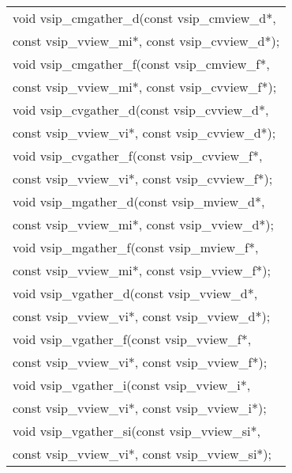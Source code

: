 \\\cvsiplh
\afh
\\\hspace*{.04\textwidth} {
\ttfamily
\begin{tabular}[H]{l}
void vsip\_cmgather\_d(const vsip\_cmview\_d*,\\*\hspace{.7cm}const vsip\_vview\_mi*, const vsip\_cvview\_d*);\\
void vsip\_cmgather\_f(const vsip\_cmview\_f*,\\*\hspace{.7cm}const vsip\_vview\_mi*, const vsip\_cvview\_f*);\\
void vsip\_cvgather\_d(const vsip\_cvview\_d*,\\*\hspace{.7cm}const vsip\_vview\_vi*, const vsip\_cvview\_d*);\\
void vsip\_cvgather\_f(const vsip\_cvview\_f*,\\*\hspace{.7cm}const vsip\_vview\_vi*, const vsip\_cvview\_f*);\\
void vsip\_mgather\_d(const vsip\_mview\_d*,\\*\hspace{.7cm}const vsip\_vview\_mi*, const vsip\_vview\_d*);\\
void vsip\_mgather\_f(const vsip\_mview\_f*,\\*\hspace{.7cm}const vsip\_vview\_mi*, const vsip\_vview\_f*);\\
void vsip\_vgather\_d(const vsip\_vview\_d*,\\*\hspace{.7cm}const vsip\_vview\_vi*, const vsip\_vview\_d*);\\
void vsip\_vgather\_f(const vsip\_vview\_f*,\\*\hspace{.7cm}const vsip\_vview\_vi*, const vsip\_vview\_f*);\\
void vsip\_vgather\_i(const vsip\_vview\_i*,\\*\hspace{.7cm}const vsip\_vview\_vi*, const vsip\_vview\_i*);\\
void vsip\_vgather\_si(const vsip\_vview\_si*,\\*\hspace{.7cm}const vsip\_vview\_vi*, const vsip\_vview\_si*);\\

\end{tabular}}
